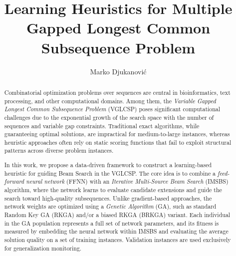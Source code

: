 \documentclass[runningheads]{llncs}
\begin{document}
	
	\title{Learning Heuristics for Multiple Gapped Longest Common Subsequence Problem}
	
	\author{Marko Djukanović 
	}
	
	\maketitle              %
 
	\vspace{-0.5cm}
    \begin{abstract}
    	Combinatorial optimization problems over sequences are central in bioinformatics, text processing, and other computational domains. Among them, the \textit{Variable Gapped Longest Common Subsequence Problem} (VGLCSP) poses significant computational challenges due to the exponential growth of the search space with the number of sequences and variable gap constraints. Traditional exact algorithms, while guaranteeing optimal solutions, are impractical for medium-to-large instances, whereas heuristic approaches often rely on static scoring functions that fail to exploit structural patterns across diverse problem instances.
    	
    	In this work, we propose a data-driven framework to construct a learning-based heuristic for guiding Beam Search in the VGLCSP. The core idea is to combine a \textit{feed-forward neural network} (FFNN) with an \textit{Iterative Multi-Source Beam Search} (IMSBS) algorithm, where the network learns to evaluate candidate extensions and guide the search toward high-quality subsequences. Unlike gradient-based approaches, the network weights are optimized using a \textit{Genetic Algorithm} (GA), such as standard Random Key GA (RKGA) and/or a biased RKGA (BRKGA) variant. Each individual in the GA population represents a full set of network parameters, and its fitness is measured by embedding the neural network within IMSBS and evaluating the average solution quality on a set of training instances. Validation instances are used exclusively for generalization monitoring.
    	

\end{abstract}
\end{document}
